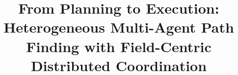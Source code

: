\documentclass[conference]{IEEEtran}
\begin{document}
\title{From Planning to Execution: Heterogeneous Multi-Agent Path Finding with Field-Centric Distributed Coordination}

\author{
}

\maketitle























\end{document}
